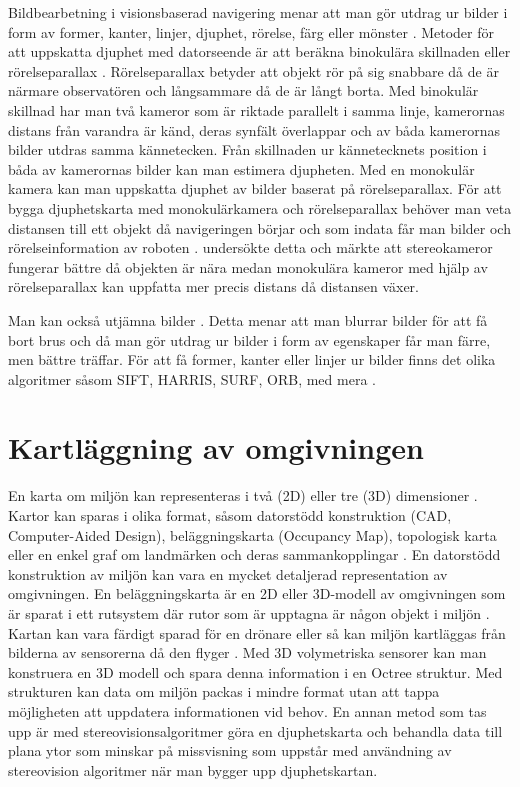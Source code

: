 Bildbearbetning i visionsbaserad navigering menar att man gör utdrag ur bilder i form av former, kanter, linjer, djuphet, rörelse, färg eller mönster \citep{982903}. Metoder för att uppskatta djuphet med datorseende är att beräkna binokulära skillnaden eller rörelseparallax \citep{suomimainittu}. Rörelseparallax betyder att objekt rör på sig snabbare då de är närmare observatören och långsammare då de är långt borta. Med binokulär skillnad har man två kameror som är riktade parallelt i samma linje, kamerornas distans från varandra är känd, deras synfält överlappar och av båda kamerornas bilder utdras samma kännetecken. Från skillnaden ur kännetecknets position i båda av kamerornas bilder kan man estimera djupheten. Med en monokulär kamera kan man uppskatta djuphet av bilder baserat på rörelseparallax. För att bygga djuphetskarta med monokulärkamera och rörelseparallax behöver man veta distansen till ett objekt då navigeringen börjar och som indata får man bilder och rörelseinformation av roboten \citep{suomimainittu}. \cite{suomimainittu} undersökte detta och märkte att stereokameror fungerar bättre då objekten är nära medan monokulära kameror med hjälp av rörelseparallax kan uppfatta mer precis distans då distansen växer. 

Man kan också utjämna bilder \citep{mapbuildingsift}. Detta menar att man blurrar bilder för att få bort brus och då man gör utdrag ur bilder i form av egenskaper får man färre, men bättre träffar. För att få former, kanter eller linjer ur bilder finns det olika algoritmer såsom SIFT, HARRIS, SURF, ORB, med mera \citep{8930783, slamproblem, mapbuildingsift}.

\section{Kartläggning av omgivningen}

En karta om miljön kan representeras i två (2D) eller tre (3D) dimensioner \citep{geospatial}. Kartor kan sparas i olika format, såsom datorstödd konstruktion (CAD, Computer-Aided Design), beläggningskarta (Occupancy Map), topologisk karta eller en enkel graf om landmärken och deras sammankopplingar \citep{982903}. En datorstödd konstruktion av miljön kan vara en mycket detaljerad representation av omgivningen. En beläggningskarta är en 2D eller 3D-modell av omgivningen som är sparat i ett rutsystem där rutor som är upptagna är någon objekt i miljön \citep{6095058, 982903}. Kartan kan vara färdigt sparad för en drönare eller så kan miljön kartläggas från bilderna av sensorerna då den flyger \citep{geospatial}. Med 3D volymetriska sensorer kan man konstruera en 3D modell och spara denna information i en Octree struktur. Med strukturen kan data om miljön packas i mindre format utan att tappa möjligheten att uppdatera informationen vid behov. En annan metod som tas upp är med stereovisionsalgoritmer göra en djuphetskarta och behandla data till plana ytor som minskar på missvisning som uppstår med användning av stereovision algoritmer när man bygger upp djuphetskartan.

